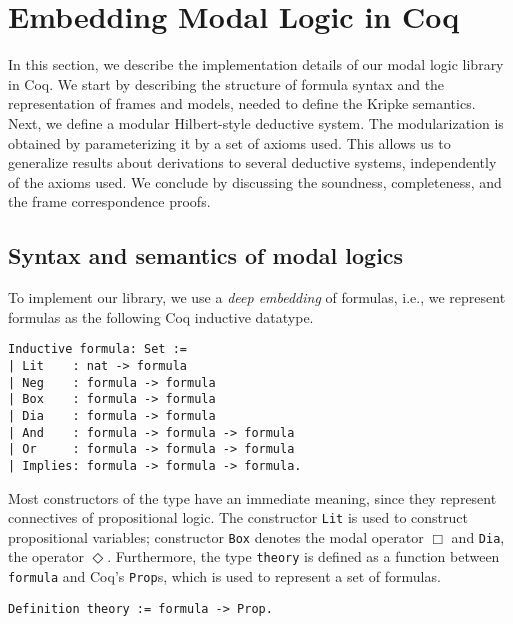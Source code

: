 \documentclass[3p,times]{elsarticle}
\begin{document}
\section{Embedding Modal Logic in Coq}\label{sec:implementation}

In this section, we describe the implementation details of our modal logic
library in Coq. We start by describing the structure of formula syntax and the
representation of frames and models, needed to define the Kripke semantics.
Next, we define a modular Hilbert-style deductive system. The modularization is
obtained by parameterizing it by a set of axioms used. This allows us to
generalize results about derivations to several deductive systems, independently
of the axioms used. We conclude by discussing the soundness, completeness, and the frame
correspondence proofs.

\subsection{Syntax and semantics of modal logics}

To implement our library, we use a \emph{deep embedding} of
formulas, i.e., we represent formulas as the following Coq inductive datatype.
\begin{verbatim}
Inductive formula: Set :=
| Lit    : nat -> formula
| Neg    : formula -> formula
| Box    : formula -> formula
| Dia    : formula -> formula
| And    : formula -> formula -> formula
| Or     : formula -> formula -> formula
| Implies: formula -> formula -> formula.
\end{verbatim}
Most constructors of the type have an immediate meaning, since they represent
connectives of propositional logic. The constructor \texttt{Lit}
is used to construct propositional variables; constructor \texttt{Box}
denotes the modal operator $\Box$ and \texttt{Dia}, the operator
$\Diamond$. Furthermore, the type \texttt{theory} is defined as a function
between \texttt{formula} and Coq's \texttt{Prop}s, which is used to represent a set of formulas.

\begin{verbatim}
Definition theory := formula -> Prop.
\end{verbatim}
\end{document}
